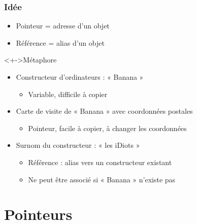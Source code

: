 \begin{frame}
\frametitle{Idée}
\begin{itemize}[<+->]
\item Pointeur = adresse d'un objet
\item Référence = alias d'un objet
\end{itemize}
\begin{exampleblock}<+->{Métaphore}
	\begin{itemize}[<+->]
	\item Constructeur d'ordinateurs : « Banana »
		\begin{itemize}
		\item Variable, difficile à copier
		\end{itemize}
	\item Carte de visite de « Banana » avec coordonnées postales
		\begin{itemize}
		\item Pointeur, facile à copier, à changer les coordonnées
		\end{itemize}
	\item Surnom du constructeur : « les iDiots »
		\begin{itemize}
		\item Référence : alias vers un constructeur existant
		\item Ne peut être associé si « Banana » n'existe pas
		\end{itemize}
	\end{itemize}
\end{exampleblock}
\end{frame}

\section{Pointeurs}

